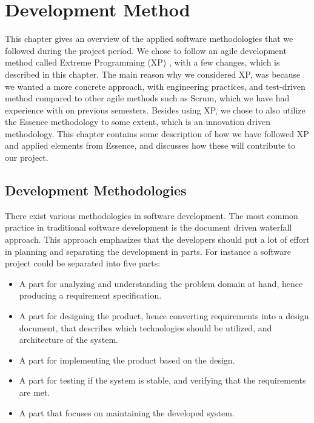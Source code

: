 
\chapter{Development Method}
\label{cha:development_method}

This chapter gives an overview of the applied software methodologies that we followed during the project period. We chose to follow an agile development method called Extreme Programming (XP) \parencite{xp}, with a few changes, which is described in this chapter. The main reason why we considered XP, was because we wanted a more concrete approach, with engineering practices, and test-driven method compared to other agile methods such as Scrum, which we have had experience with on previous semesters. Besides using XP, we chose to also utilize the Essence methodology \parencite{essence_book} to some extent, which is an innovation driven methodology. This chapter contains some description of how we have followed XP and applied elements from Essence, and discusses how these will contribute to our project.

\section{Development Methodologies}
\label{sec:development_methodologies}
There exist various methodologies in software development. The most common practice in traditional software development is the document driven waterfall approach. This approach emphasizes that the developers should put a lot of effort in planning and separating the development in parts. For instance a software project could be separated into five parts:

\begin{itemize}
    \setlength\itemsep{-0.2em}
    \item A part for analyzing and understanding the problem domain at hand, hence producing a requirement specification. 
    \item A part for designing the product, hence converting requirements into a design document, that describes which technologies should be utilized,  and architecture of the system. 
    \item A part for implementing the product based on the design.
    \item A part for testing if the system is stable, and verifying that the requirements are met. 
    \item A part that focuses on maintaining the developed system. 
\end{itemize}

